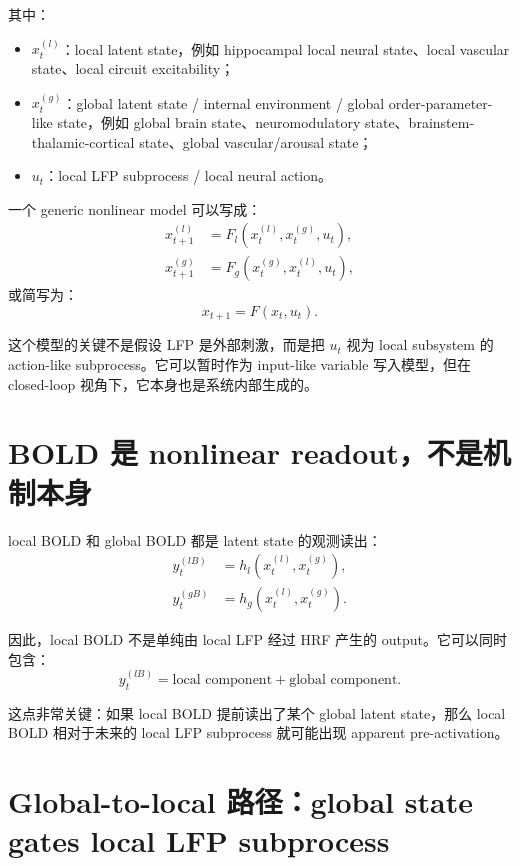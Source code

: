 \documentclass[11pt,a4paper]{ctexart}
\begin{document}
其中：
\begin{itemize}
    \item $x_t^{(l)}$：local latent state，例如 hippocampal local neural state、local vascular state、local circuit excitability；
    \item $x_t^{(g)}$：global latent state / internal environment / global order-parameter-like state，例如 global brain state、neuromodulatory state、brainstem-thalamic-cortical state、global vascular/arousal state；
    \item $u_t$：local LFP subprocess / local neural action。
\end{itemize}

一个 generic nonlinear model 可以写成：
\begin{align}
    x_{t+1}^{(l)} &= F_l\!\left(x_t^{(l)}, x_t^{(g)}, u_t\right), \\
    x_{t+1}^{(g)} &= F_g\!\left(x_t^{(g)}, x_t^{(l)}, u_t\right),
\end{align}
或简写为：
\begin{equation}
    x_{t+1}=F(x_t,u_t).
\end{equation}

这个模型的关键不是假设 LFP 是外部刺激，而是把 $u_t$ 视为 local subsystem 的 action-like subprocess。它可以暂时作为 input-like variable 写入模型，但在 closed-loop 视角下，它本身也是系统内部生成的。

\section{BOLD 是 nonlinear readout，不是机制本身}

local BOLD 和 global BOLD 都是 latent state 的观测读出：
\begin{align}
    y_t^{(lB)} &= h_l\!\left(x_t^{(l)}, x_t^{(g)}\right), \\
    y_t^{(gB)} &= h_g\!\left(x_t^{(l)}, x_t^{(g)}\right).
\end{align}

因此，local BOLD 不是单纯由 local LFP 经过 HRF 产生的 output。它可以同时包含：
\begin{equation}
    y_t^{(lB)} = \text{local component} + \text{global component}.
\end{equation}

这点非常关键：如果 local BOLD 提前读出了某个 global latent state，那么 local BOLD 相对于未来的 local LFP subprocess 就可能出现 apparent pre-activation。

\section{Global-to-local 路径：global state gates local LFP subprocess}
\end{document}
